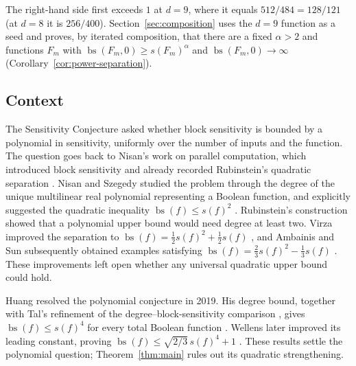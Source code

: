 \documentclass[11pt]{article}
\newcommand{\bs}{\operatorname{bs}}
\theoremstyle{definition}
\theoremstyle{remark}
\begin{document}
The right-hand side first exceeds \(1\) at \(d=9\), where it equals
\(512/484=128/121\) (at \(d=8\) it is \(256/400\)). Section~\ref{sec:composition} uses the
\(d=9\) function as a seed and proves, by iterated composition, that there are
a fixed \(\alpha>2\) and functions \(F_m\) with
\(\bs(F_m,0)\ge s(F_m)^\alpha\) and \(\bs(F_m,0)\to\infty\)
(Corollary~\ref{cor:power-separation}).

\subsection{Context}
The Sensitivity Conjecture asked whether block sensitivity is bounded by a
polynomial in sensitivity, uniformly over the number of inputs and the
function. The question goes back to Nisan's work on parallel computation,
which introduced block sensitivity and already recorded Rubinstein's
quadratic separation \cite[Section~2]{Nisan1989}.
Nisan and Szegedy studied the problem through the degree of the unique
multilinear real polynomial representing a Boolean function, and explicitly
suggested the quadratic inequality \(\bs(f)\le s(f)^2\)
\cite[Section~4]{NisanSzegedy1994}.
Rubinstein's construction \cite{Rubinstein1995} showed that a polynomial
upper bound would need degree at least two. Virza improved the separation
to \(\bs(f)=\tfrac12s(f)^2+\tfrac12s(f)\) \cite{Virza2011}, and
Ambainis and Sun subsequently obtained examples satisfying
\(\bs(f)=\frac23s(f)^2-\frac13s(f)\)
\cite[Theorem~1]{AmbainisSun2011}.
These improvements left open whether any universal quadratic upper bound
could hold.

Huang resolved the polynomial conjecture in 2019. His degree bound,
together with Tal's refinement of the degree--block-sensitivity comparison
\cite{Tal2013}, gives \(\bs(f)\le s(f)^4\) for every total Boolean function
\cite[Theorem~1.5]{Huang2019}. Wellens later improved its leading constant,
proving \(\bs(f)\le\sqrt{2/3}\,s(f)^4+1\)
\cite[Corollary~4.2]{Wellens2022}.
These results settle the polynomial question; Theorem~\ref{thm:main} rules out
its quadratic strengthening.
\end{document}

